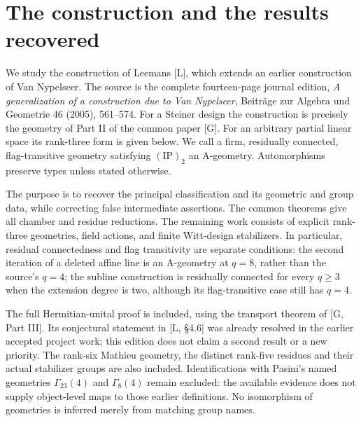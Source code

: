\section{The construction and the results recovered}
We study the construction of Leemans [L], which extends an earlier
construction of Van Nypelseer. The source is the complete fourteen-page
journal edition, \emph{A generalization of a construction due to Van
Nypelseer}, Beitr\"age zur Algebra und Geometrie 46 (2005), 561--574.
For a Steiner design the construction is precisely the geometry of
Part II of the common paper [G]. For an arbitrary partial linear space
its rank-three form is given below. We call a firm, residually connected,
flag-transitive geometry satisfying $(\mathrm{IP})_2$ an A-geometry.
Automorphisms preserve types unless stated otherwise.

The purpose is to recover the principal classification and its geometric
and group data, while correcting false intermediate assertions. The
common theorems give all chamber and residue reductions. The remaining
work consists of explicit rank-three geometries, field actions, and
finite Witt-design stabilizers. In particular, residual connectedness
and flag transitivity are separate conditions: the second iteration of
a deleted affine line is an A-geometry at $q=8$, rather than the source's
$q=4$; the subline construction is residually connected for every $q\geq3$
when the extension degree is two, although its flag-transitive case still
has $q=4$.

The full Hermitian-unital proof is included, using the transport theorem
of [G, Part III]. Its conjectural statement in [L, \S4.6] was already
resolved in the earlier accepted project work; this edition does not
claim a second result or a new priority. The rank-six Mathieu geometry,
the distinct rank-five residues and their actual stabilizer groups are
also included. Identifications with Pasini's named geometries
$\Gamma_{23}(4)$ and $\Gamma_8(4)$ remain excluded: the available evidence
does not supply object-level maps to those earlier definitions. No
isomorphism of geometries is inferred merely from matching group names.

